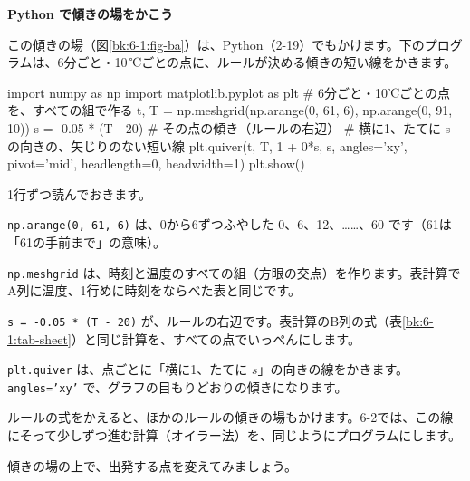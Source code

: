 \begin{motto}[2]
\textbf{Python で傾きの場をかこう}\par
この傾きの場（図\ref{bk:6-1:fig-ba}）は、Python（2-19）でもかけます。下のプログラムは、6分ごと・10\,℃ごとの点に、ルールが決める傾きの短い線をかきます。
\begin{bkcode}[Python]
import numpy as np
import matplotlib.pyplot as plt
\# 6分ごと・10℃ごとの点を、すべての組で作る
t, T = np.meshgrid(np.arange(0, 61, 6),
                   np.arange(0, 91, 10))
s = -0.05 * (T - 20)      \# その点の傾き（ルールの右辺）
\# 横に1、たてに s の向きの、矢じりのない短い線
plt.quiver(t, T, 1 + 0*s, s, angles='xy',
           pivot='mid', headlength=0, headwidth=1)
plt.show()
\end{bkcode}
1行ずつ読んでおきます。
\begin{enumerate}[label={\bkcircled[\bkTT]{\arabic*}}, leftmargin=2.4\zw, itemsep=1pt, topsep=2pt]
\item \texttt{np.arange(0, 61, 6)} は、0から6ずつふやした 0、6、12、……、60 です（61は「61の手前まで」の意味）。
\item \texttt{np.meshgrid} は、時刻と温度のすべての組（方眼の交点）を作ります。表計算でA列に温度、1行めに時刻をならべた表と同じです。
\item \texttt{s = -0.05 * (T - 20)} が、ルールの右辺です。表計算のB列の式（表\ref{bk:6-1:tab-sheet}）と同じ計算を、すべての点でいっぺんにします。
\item \texttt{plt.quiver} は、点ごとに「横に1、たてに $s$」の向きの線をかきます。\texttt{angles='xy'} で、グラフの目もりどおりの傾きになります。
\end{enumerate}
ルールの式をかえると、ほかのルールの傾きの場もかけます。6-2では、この線にそって少しずつ進む計算（オイラー法）を、同じようにプログラムにします。
\end{motto}


\label{bk:6-1:shoki}傾きの場の上で、出発する点を変えてみましょう。

